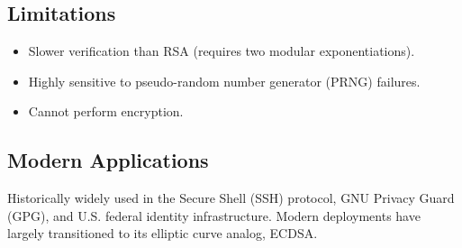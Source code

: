 \subsection{Limitations}
\begin{itemize}
    \item Slower verification than RSA (requires two modular exponentiations).
    \item Highly sensitive to pseudo-random number generator (PRNG) failures.
    \item Cannot perform encryption.
\end{itemize}

\subsection{Modern Applications}
Historically widely used in the Secure Shell (SSH) protocol, GNU Privacy Guard (GPG), and U.S. federal identity infrastructure. Modern deployments have largely transitioned to its elliptic curve analog, ECDSA.

